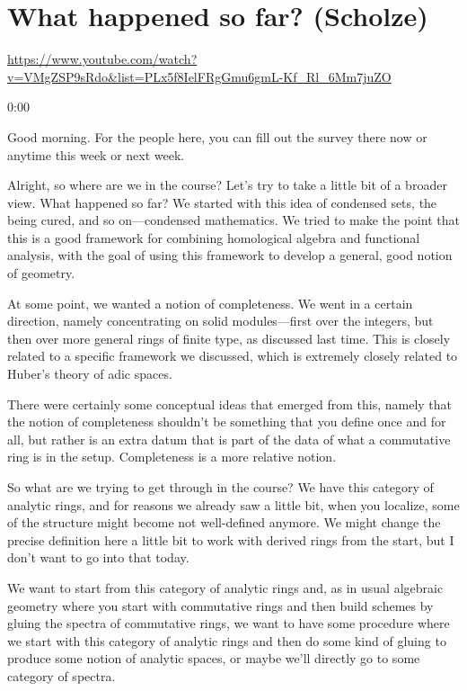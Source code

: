 
\section{\ufs What happened so far? (Scholze)}

\url{https://www.youtube.com/watch?v=VMgZSP9sRdo&list=PLx5f8IelFRgGmu6gmL-Kf_Rl_6Mm7juZO}
\renewcommand{\yt}[2]{\href{https://www.youtube.com/watch?v=VMgZSP9sRdo&list=PLx5f8IelFRgGmu6gmL-Kf_Rl_6Mm7juZO&t=#1}{#2}}
\vspace{1em}

\begin{unfinished}{0:00}

Good morning. For the people here, you can fill out the survey there now or anytime this week or next week.

Alright, so where are we in the course? Let's try to take a little bit of a broader view. What happened so far? We started with this idea of condensed sets, the being cured, and so on---condensed mathematics. We tried to make the point that this is a good framework for combining homological algebra and functional analysis, with the goal of using this framework to develop a general, good notion of geometry.

At some point, we wanted a notion of completeness. We went in a certain direction, namely concentrating on solid modules---first over the integers, but then over more general rings of finite type, as discussed last time. This is closely related to a specific framework we discussed, which is extremely closely related to Huber's theory of adic spaces.

There were certainly some conceptual ideas that emerged from this, namely that the notion of completeness shouldn't be something that you define once and for all, but rather is an extra datum that is part of the data of what a commutative ring is in the setup. Completeness is a more relative notion.

So what are we trying to get through in the course? We have this category of analytic rings, and for reasons we already saw a little bit, when you localize, some of the structure might become not well-defined anymore. We might change the precise definition here a little bit to work with derived rings from the start, but I don't want to go into that today.

We want to start from this category of analytic rings and, as in usual algebraic geometry where you start with commutative rings and then build schemes by gluing the spectra of commutative rings, we want to have some procedure where we start with this category of analytic rings and then do some kind of gluing to produce some notion of analytic spaces, or maybe we'll directly go to some category of spectra.


\end{unfinished}
